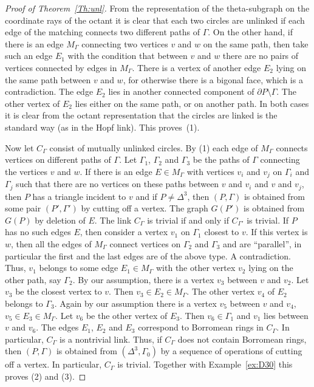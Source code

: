 \documentclass[12pt]{amsart}
\theoremstyle{definition}
\theoremstyle{remark}
\begin{document}
\begin{proof}[Proof of Theorem~\ref{Th:unl}]
From the representation of the theta-subgraph on the coordinate rays of the octant 
it is clear that each two circles are unlinked if each edge of the matching connects two different paths of $\Gamma$.
On the other hand, if there is an edge $M_\Gamma$
connecting two vertices $v$ and $w$ on the same path, then take such an edge $E_1$ 
with the condition that between $v$ and $w$ there are no pairs of vertices connected by edges in $M_\Gamma$. 
There is a vertex of another edge $E_2$ lying on the same path between $v$ and $w$, 
for otherwise there is a bigonal face, which is a contradiction. The edge $E_2$ lies 
in another connected component of $\partial P\setminus\Gamma$. The other vertex of $E_2$ lies
either on the same path, or on another path. In both cases it is clear from the octant representation
that the circles are linked is the standard way (as in the Hopf link). This proves~(1).

Now let $C_\Gamma$ consist of mutually unlinked circles. By (1) each edge of $M_{\Gamma}$ connects vertices on different paths
of $\Gamma$. Let $\Gamma_1$, $\Gamma_2$ and $\Gamma_3$ be the paths of $\Gamma$ connecting the vertices $v$ and $w$.
If there is an edge $E\in M_\Gamma$ with vertices $v_i$ and $v_j$ on $\Gamma_i$ and $\Gamma_j$ such that there are no vertices 
on these paths between $v$ and $v_i$ and $v$ and $v_j$,
then $P$ has a triangle incident to $v$ and if $P\ne \Delta^3$, then $(P,\Gamma)$ is obtained from 
some pair $(P',\Gamma')$ by cutting off a vertex.  The graph $G(P')$ is obtained from $G(P)$ by deletion of $E$. 
The link $C_{\Gamma}$ is trivial if and only if $C_{\Gamma'}$ is trivial. If $P$ has no such edges $E$,
then consider a vertex $v_1$ on $\Gamma_1$ closest to $v$. If this vertex is $w$, then all the edges of $M_{\Gamma}$ connect 
vertices on $\Gamma_2$ and $\Gamma_3$ and are ``parallel'', in particular the first and the last edges are of the above type.
A contradiction. Thus, $v_1$ belongs to some edge $E_1\in M_{\Gamma}$ with the other vertex $v_2$ 
lying on the other path, say $\Gamma_2$. By our assumption, there is a vertex $v_3$ between $v$ and $v_2$. Let $v_3$
be the closest vertex to $v$.  Then $v_3\in E_2\in M_\Gamma$. The other vertex $v_4$ of $E_2$ belongs to $\Gamma_3$.
Again by our assumption there is a vertex $v_5$ between $v$ and $v_4$, $v_5\in E_3\in M_\Gamma$. Let $v_6$
be the other vertex of $E_3$. Then $v_6\in \Gamma_1$ and $v_1$ lies between $v$ and $v_6$. The edges $E_1$,
$E_2$ and $E_3$ correspond to Borromean rings in $C_\Gamma$. In particular, $C_\Gamma$ is a nontrivial link.
Thus, if $C_\Gamma$ does not contain Borromean rings, then $(P,\Gamma)$ is obtained from 
$(\Delta^3,\Gamma_0)$ by a sequence of operations of cutting off a vertex. In particular, $C_\Gamma$ is trivial. Together
with Example~\ref{ex:D30} this proves (2) and (3).
\end{proof}
\end{document}
